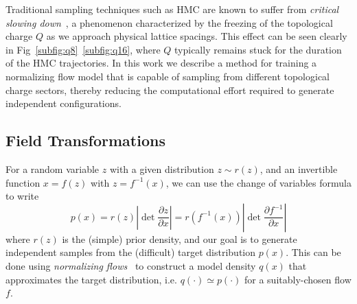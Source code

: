 \documentclass[a4paper,11pt]{article}
\begin{document}
Traditional sampling techniques such as HMC are known to suffer from
\emph{critical slowing down}~\cite{Schaefer:2010hu}, a phenomenon characterized
by the freezing of the topological charge \(Q\) as we approach physical lattice
spacings.
%
This effect can be seen clearly in Fig~\ref{subfig:q8}~\ref{subfig:q16}, where
\(Q\) typically remains stuck for the duration of the HMC trajectories.
%
In this work we describe a method for training a normalizing flow model that is
capable of sampling from different topological charge sectors, thereby reducing
the computational effort required to generate independent configurations.
%

\subsection{\label{subsec:ft}Field Transformations}
%
For a random variable \(z\) with a given distribution \(z \sim r(z)\), and an
invertible function \(x = f(z)\) with \(z = f^{-1}(x)\), we can use the change
of variables formula to write
%
\begin{equation}
    p(x) = r(z)\left|\det\frac{\partial z}{\partial x}\right| =
    r(f^{-1}(x))\left|\det\frac{\partial f^{-1}}{\partial x}\right|
\end{equation}
%
where \(r(z)\) is the (simple) prior density, and our goal is to generate
independent samples from the (difficult) target distribution \(p(x)\).
%
This can be done using \emph{normalizing flows}~\cite{rezende2015variational}
to construct a model density \(q(x)\) that approximates the target
distribution, i.e. \(q(\cdot)\simeq p(\cdot)\) for a suitably-chosen flow
\(f\).
\end{document}
